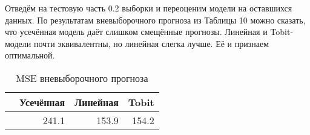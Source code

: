 \documentclass[a4paper,12pt]{article}
\begin{document}
Отведём на тестовую часть 0.2 выборки и переоценим модели на оставшихся данных. По результатам вневыборочного прогноза из Таблицы 10 можно сказать, что усечённая модель даёт слишком смещённые прогнозы. Линейная и Tobit-модели почти эквивалентны, но линейная слегка лучше. Её и признаем оптимальной.

\begin{table}[ht]
	\centering
	\begin{tabular}{|rrrr|}
		\hline
		& Усечённая & Линейная & Tobit \\ 
		\hline
		 & 241.1 & 153.9 & 154.2 \\ 
		\hline
	\end{tabular}
\caption{MSE вневыборочного прогноза}
\end{table}
\end{document}
